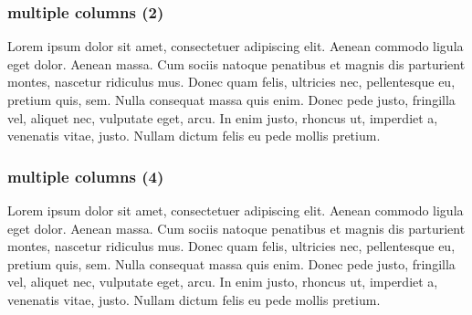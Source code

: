 \begin{frame}
\frametitle{multiple columns (2)}
\setlength\columnsep{30pt}
\begin{multicols}{2}
\justifying
Lorem ipsum dolor sit amet, consectetuer adipiscing elit. Aenean commodo ligula eget dolor. Aenean massa. Cum sociis natoque penatibus et magnis dis parturient montes, nascetur ridiculus mus. Donec quam felis, ultricies nec, pellentesque eu, pretium quis, sem. Nulla consequat massa quis enim. Donec pede justo, fringilla vel, aliquet nec, vulputate eget, arcu. In enim justo, rhoncus ut, imperdiet a, venenatis vitae, justo. Nullam dictum felis eu pede mollis pretium.
\end{multicols}
\end{frame}

\begin{frame}
\frametitle{multiple columns (4)}
\setlength\columnsep{30pt}
\begin{multicols}{4}
\justifying
Lorem ipsum dolor sit amet, consectetuer adipiscing elit. Aenean commodo ligula eget dolor. Aenean massa. Cum sociis natoque penatibus et magnis dis parturient montes, nascetur ridiculus mus. Donec quam felis, ultricies nec, pellentesque eu, pretium quis, sem. Nulla consequat massa quis enim. Donec pede justo, fringilla vel, aliquet nec, vulputate eget, arcu. In enim justo, rhoncus ut, imperdiet a, venenatis vitae, justo. Nullam dictum felis eu pede mollis pretium.
\end{multicols}
\end{frame}

